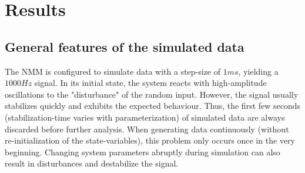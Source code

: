 \chapter{Results}\label{ch:results}


\section{General features of the simulated data}\label{sec:general-features-of-the-simulated-data}

The NMM is configured to simulate data with a step-size of $1 ms$, yielding a $1000 Hz$ signal.
In its initial state, the system reacts with high-amplitude oscillations to the "disturbance" of the random input.
However, the signal usually stabilizes quickly and exhibits the expected behaviour.
Thus, the first few seconds (stabilization-time varies with parameterization) of simulated data
are always discarded before further analysis.
When generating data continuously (without re-initialization of the state-variables),
this problem only occurs once in the very beginning.
Changing system parameters abruptly during simulation can also result in disturbances and destabilize the
signal.

